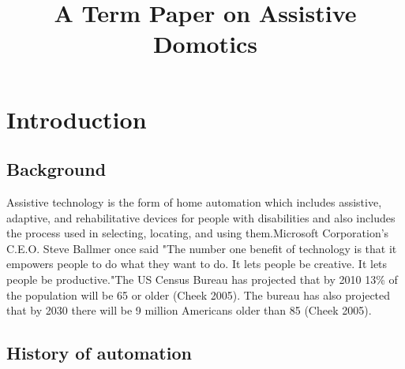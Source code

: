 \documentclass[11pt, a4paper, oneside]{book}
\begin{document}
\frontmatter

\tableofcontents
\mainmatter
\title{A Term Paper on Assistive Domotics}

\section{Introduction}
	\subsection{Background}%
	Assistive technology is the form of home automation which includes assistive, adaptive, and rehabilitative devices for people with disabilities and also includes the process used in selecting, locating, and using them.Microsoft Corporation’s C.E.O. Steve Ballmer once said "The number one benefit of technology is that it empowers people to do what they want to do. It lets people be creative. It lets people be productive."The US Census Bureau has projected that by 2010 13\% of the population will be 65 or older (Cheek 2005). The bureau has also projected that by 2030 there will be 9 million Americans older than 85 (Cheek 2005).
	
	\subsection{History of automation}
\end{document}
